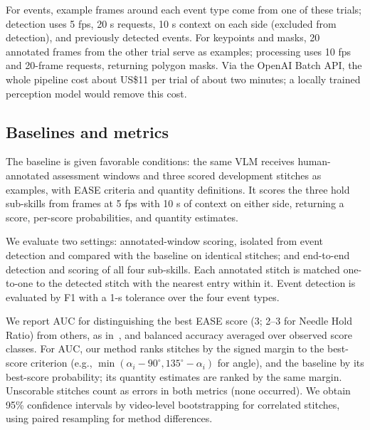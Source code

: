 For events, example frames around each event type come from one of these
trials; detection uses 5 fps, 20 s requests, 10 s context on each side
(excluded from detection), and previously detected events. For keypoints and
masks, 20 annotated frames from the other trial serve as examples; processing
uses 10 fps and 20-frame requests, returning polygon masks.
Via the OpenAI Batch API, the whole pipeline cost about US\$11 per trial of
about two minutes; a locally trained perception model would remove this cost.

\subsection{Baselines and metrics}
\label{ssec:metrics}

The baseline is given favorable conditions: the same VLM receives
human-annotated assessment windows and three scored development stitches as
examples, with EASE criteria and quantity definitions. It scores the three hold
sub-skills from frames at 5 fps with 10 s of context on either side,
returning a score, per-score probabilities, and quantity estimates.

We evaluate two settings: annotated-window scoring, isolated from event
detection and compared with the baseline on identical stitches; and
end-to-end detection and scoring of all four sub-skills. Each annotated stitch
is matched one-to-one to the detected stitch with the nearest entry within
it. Event detection is evaluated by F1 with a 1-s tolerance over the four event
types.

We report AUC for distinguishing the best EASE score (3; 2--3 for Needle
Hold Ratio) from others, as in~\cite{Deo2026}, and balanced accuracy averaged
over observed score classes. For AUC, our method ranks stitches by the signed
margin to the best-score criterion (e.g.,
$\min(\alpha_i-90^\circ,135^\circ-\alpha_i)$ for angle), and the baseline by
its best-score probability; its quantity estimates are ranked by the same
margin. Unscorable stitches count as errors in both metrics (none occurred).
We obtain 95\% confidence intervals by video-level bootstrapping for
correlated stitches, using paired resampling for method
differences.
